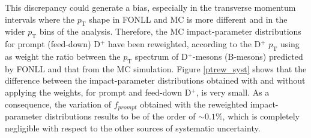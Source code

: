\documentclass[b5paper,10pt,twoside,oldstyle,classica]{toptesi}
\newcommand{\pt}{p_\text{T}}
\begin{document}
This discrepancy could generate a bias, especially in the transverse momentum intervals where the $\pt$ shape in FONLL and MC is more different and in the wider $\pt$ bins of the analysis. Therefore, the MC impact-parameter distributions for prompt (feed-down) D$^+$ have been reweighted, according to the D$^+$ $\pt$ using as weight the ratio between the $\pt$ spectrum of D$^+$-mesons (B-mesons) predicted by FONLL and that from the MC simulation. Figure \ref{ptrew_syst} shows that the difference between the impact-parameter distributions obtained with and without applying the weights, for prompt and feed-down D$^+$, is very small. As a consequence, the variation of $f_{prompt}$ obtained with the reweighted impact-parameter distributions results to be of the order of $\sim 0.1\%$, which is completely negligible with respect to the other sources of systematic uncertainty.
\end{document}

